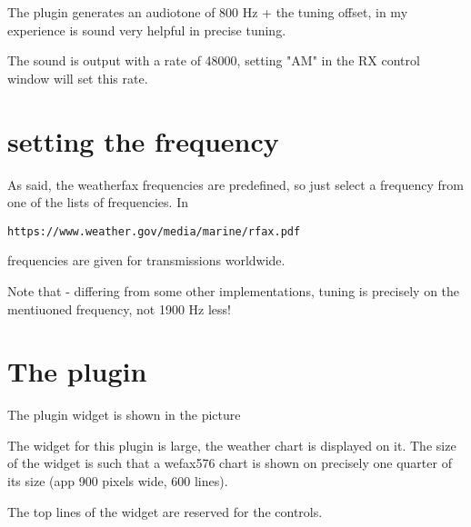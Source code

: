 \documentclass[11pt]{article}
\begin{document}

The plugin generates an audiotone of 800 Hz + the tuning offset, in my
experience is sound very helpful in precise tuning.

The sound is output with a rate of 48000, setting "AM" in the RX control window
will set this rate.

\section{setting the frequency}

As said, the weatherfax frequencies are predefined, so just select
a frequency from one of the lists of frequencies.
In 
\begin{verbatim}
https://www.weather.gov/media/marine/rfax.pdf
\end{verbatim}

frequencies are given for transmissions worldwide.


Note that - differing from some other implementations, tuning is
precisely on the mentiuoned frequency, not 1900 Hz less!
\section{The plugin}
The plugin widget is shown in the picture


The widget for this plugin is large, the weather chart is displayed
on it. The size of the widget is such that a wefax576 chart is shown
on precisely one quarter of its size (app 900 pixels wide, 600 lines).

The top lines of the widget are reserved for the controls.
\end{document}
